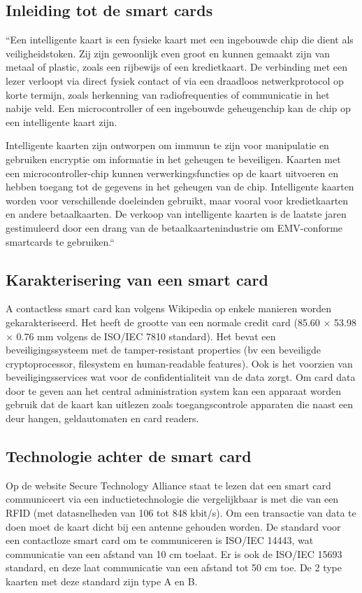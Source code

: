 \subsection{Inleiding tot de smart cards}
``Een intelligente kaart is een fysieke kaart met een ingebouwde chip die dient als veiligheidstoken. Zij zijn gewoonlijk even groot en kunnen gemaakt zijn van metaal of plastic, zoals een rijbewijs of een kredietkaart. De verbinding met een lezer verloopt via direct fysiek contact of via een draadloos netwerkprotocol op korte termijn, zoals herkenning van radiofrequenties of communicatie in het nabije veld. Een microcontroller of een ingebouwde geheugenchip kan de chip op een intelligente kaart zijn.

Intelligente kaarten zijn ontworpen om immuun te zijn voor manipulatie en gebruiken encryptie om informatie in het geheugen te beveiligen. Kaarten met een microcontroller-chip kunnen verwerkingsfuncties op de kaart uitvoeren en hebben toegang tot de gegevens in het geheugen van de chip. Intelligente kaarten worden voor verschillende doeleinden gebruikt, maar vooral voor kredietkaarten en andere betaalkaarten. De verkoop van intelligente kaarten is de laatste jaren gestimuleerd door een drang van de betaalkaartenindustrie om EMV-conforme smartcards te gebruiken.``

\subsection{Karakterisering van een smart card}
A contactless smart card kan volgens Wikipedia op enkele manieren worden gekarakteriseerd. Het heeft de grootte van een normale credit card (85.60 × 53.98 × 0.76 mm volgens de ISO/IEC 7810 standard). Het bevat een beveiligingssysteem met de tamper-resistant properties (bv een beveiligde cryptoprocessor, filesystem en human-readable features). Ook is het voorzien van beveiligingsservices wat voor de confidentialiteit van de data zorgt. Om card data door te geven aan het central administration system kan een apparaat worden gebruik dat de kaart kan uitlezen zoals toegangscontrole apparaten die naast een deur hangen, geldautomaten en card readers.

\subsection{Technologie achter de smart card}
Op de website Secure Technology Alliance staat te lezen dat een smart card communiceert via een inductietechnologie die vergelijkbaar is met die van een RFID (met datasnelheden van 106 tot 848 kbit/s). Om een transactie van data te doen moet de kaart dicht bij een antenne gehouden worden. De standard voor een contactloze smart card om te communiceren is ISO/IEC 14443, wat communicatie van een afstand van 10 cm toelaat. Er is ook de ISO/IEC 15693 standard, en deze laat communicatie van een afstand tot 50 cm toe. De 2 type kaarten met deze standard zijn type A en B. 

